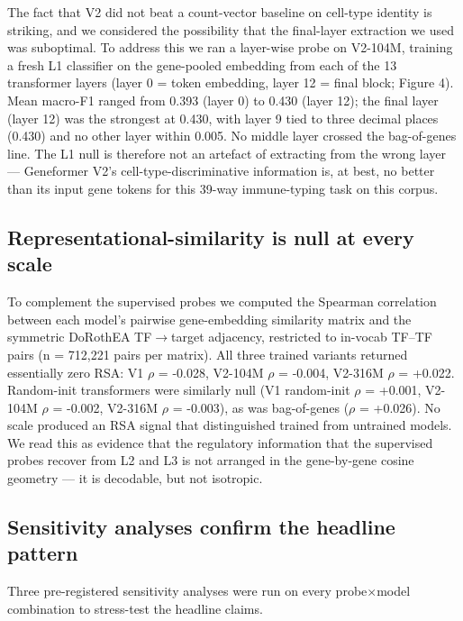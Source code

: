 \documentclass[
  11pt,
]{article}
\begin{document}
The fact that V2 did not beat a count-vector baseline on cell-type
identity is striking, and we considered the possibility that the
final-layer extraction we used was suboptimal. To address this we ran a
layer-wise probe on V2-104M, training a fresh L1 classifier on the
gene-pooled embedding from each of the 13 transformer layers (layer 0 =
token embedding, layer 12 = final block; Figure 4). Mean macro-F1 ranged
from 0.393 (layer 0) to 0.430 (layer 12); the final layer (layer 12)
was the strongest at 0.430, with layer 9 tied to three decimal places
(0.430) and no other layer within 0.005. No middle layer crossed the bag-of-genes line. The L1
null is therefore not an artefact of extracting from the wrong layer ---
Geneformer V2's cell-type-discriminative information is, at best, no
better than its input gene tokens for this 39-way immune-typing task on
this corpus.

\subsection{Representational-similarity is null at every
scale}\label{representational-similarity-is-null-at-every-scale}

To complement the supervised probes we computed the Spearman correlation
between each model's pairwise gene-embedding similarity matrix and the
symmetric DoRothEA TF$\to$target adjacency, restricted to in-vocab TF--TF
pairs (n = 712,221 pairs per matrix). All three trained variants
returned essentially zero RSA: V1 $\rho$ = -0.028, V2-104M $\rho$ = -0.004,
V2-316M $\rho$ = +0.022. Random-init transformers were similarly null (V1 random-init $\rho$ = +0.001, V2-104M $\rho$ = -0.002, V2-316M $\rho$ = -0.003), as was bag-of-genes ($\rho$ = +0.026). No scale produced an RSA
signal that distinguished trained from untrained models. We read this as
evidence that the regulatory information that the supervised probes
recover from L2 and L3 is not arranged in the gene-by-gene cosine
geometry --- it is decodable, but not isotropic.

\subsection{Sensitivity analyses confirm the headline
pattern}\label{sensitivity-analyses-confirm-the-headline-pattern}

Three pre-registered sensitivity analyses were run on every probe$\times$model
combination to stress-test the headline claims.
\end{document}
